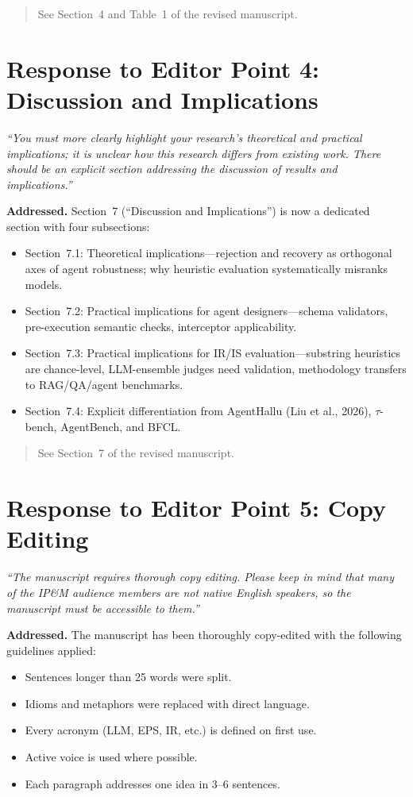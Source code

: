 \documentclass[11pt]{article}
\newcommand{\editortext}[1]{\textit{\color{gray}#1}}
\newcommand{\newtext}[1]{\begin{quote}\small #1\end{quote}}
\begin{document}
\newtext{See Section~4 and Table~1 of the revised manuscript.}

\section{Response to Editor Point 4: Discussion and Implications}

\editortext{``You must more clearly highlight your research's theoretical
and practical implications; it is unclear how this research differs from
existing work. There should be an explicit section addressing the
discussion of results and implications.''}

\textbf{Addressed.} Section~7 (``Discussion and Implications'') is now a
dedicated section with four subsections:
\begin{itemize}[nosep]
  \item Section~7.1: Theoretical implications---rejection and recovery as
    orthogonal axes of agent robustness; why heuristic evaluation
    systematically misranks models.
  \item Section~7.2: Practical implications for agent designers---schema
    validators, pre-execution semantic checks, interceptor applicability.
  \item Section~7.3: Practical implications for IR/IS evaluation---substring
    heuristics are chance-level, LLM-ensemble judges need validation,
    methodology transfers to RAG/QA/agent benchmarks.
  \item Section~7.4: Explicit differentiation from AgentHallu
    (Liu et al., 2026), $\tau$-bench, AgentBench, and BFCL.
\end{itemize}

\newtext{See Section~7 of the revised manuscript.}

\section{Response to Editor Point 5: Copy Editing}

\editortext{``The manuscript requires thorough copy editing. Please keep
in mind that many of the IP\&M audience members are not native English
speakers, so the manuscript must be accessible to them.''}

\textbf{Addressed.} The manuscript has been thoroughly copy-edited with
the following guidelines applied:
\begin{itemize}[nosep]
  \item Sentences longer than 25 words were split.
  \item Idioms and metaphors were replaced with direct language.
  \item Every acronym (LLM, EPS, IR, etc.) is defined on first use.
  \item Active voice is used where possible.
  \item Each paragraph addresses one idea in 3--6 sentences.
\end{itemize}
\end{document}
